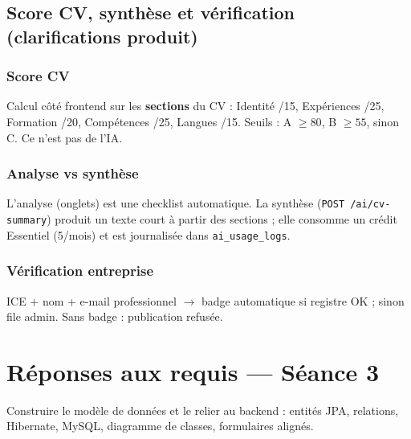 \documentclass[11pt,a4paper,oneside]{report}
\begin{document}
\section{Score CV, synthèse et vérification (clarifications produit)}
\subsection{Score CV}
Calcul côté frontend sur les \textbf{sections} du CV : Identité /15, Expériences /25, Formation /20, Compétences /25, Langues /15. Seuils : A $\ge 80$, B $\ge 55$, sinon C. Ce n'est pas de l'IA.

\subsection{Analyse vs synthèse}
L'analyse (onglets) est une checklist automatique. La synthèse (\texttt{POST /ai/cv-summary}) produit un texte court à partir des sections ; elle consomme un crédit Essentiel (5/mois) et est journalisée dans \texttt{ai\_usage\_logs}.

\subsection{Vérification entreprise}
ICE + nom + e-mail professionnel $\rightarrow$ badge automatique si registre OK ; sinon file admin. Sans badge : publication refusée.

\chapter{Réponses aux requis --- Séance 3}

\begin{reqbox}[title=\textbf{Requis Séance 3}]
Construire le modèle de données et le relier au backend : entités JPA, relations, Hibernate, MySQL, diagramme de classes, formulaires alignés.
\end{reqbox}
\end{document}
